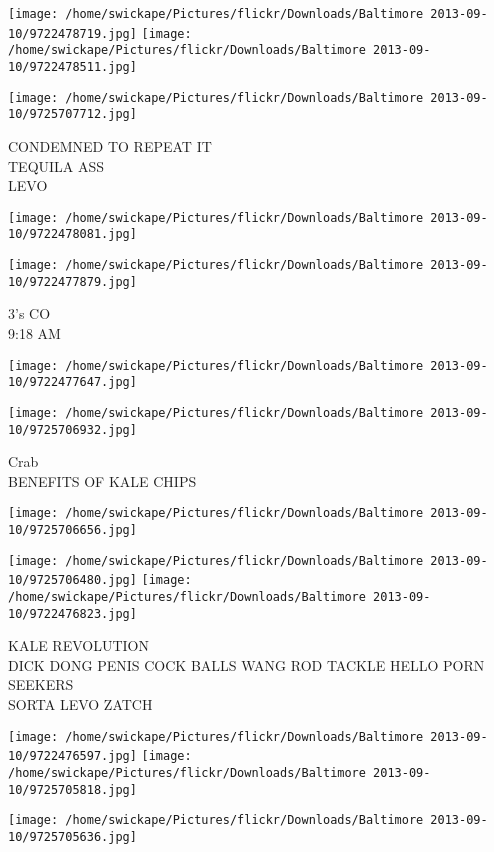 \documentclass[10pt,letterpaper]{article}
\begin{document}
\texttt{[image: /home/swickape/Pictures/flickr/Downloads/Baltimore 2013-09-10/9722478719.jpg]}
\texttt{[image: /home/swickape/Pictures/flickr/Downloads/Baltimore 2013-09-10/9722478511.jpg]}

\texttt{[image: /home/swickape/Pictures/flickr/Downloads/Baltimore 2013-09-10/9725707712.jpg]}

CONDEMNED TO REPEAT IT\\
TEQUILA ASS\\
LEVO
\pagebreak

\texttt{[image: /home/swickape/Pictures/flickr/Downloads/Baltimore 2013-09-10/9722478081.jpg]}

\vspace{0.25in}
\texttt{[image: /home/swickape/Pictures/flickr/Downloads/Baltimore 2013-09-10/9722477879.jpg]}

3's CO\\
9:18 AM
\pagebreak

\texttt{[image: /home/swickape/Pictures/flickr/Downloads/Baltimore 2013-09-10/9722477647.jpg]}

\vspace{0.25in}
\texttt{[image: /home/swickape/Pictures/flickr/Downloads/Baltimore 2013-09-10/9725706932.jpg]}

Crab\\
BENEFITS OF KALE CHIPS
\pagebreak

\texttt{[image: /home/swickape/Pictures/flickr/Downloads/Baltimore 2013-09-10/9725706656.jpg]}

\vspace{0.25in}
\texttt{[image: /home/swickape/Pictures/flickr/Downloads/Baltimore 2013-09-10/9725706480.jpg]}
\texttt{[image: /home/swickape/Pictures/flickr/Downloads/Baltimore 2013-09-10/9722476823.jpg]}

KALE REVOLUTION\\
DICK DONG PENIS COCK BALLS WANG ROD TACKLE HELLO PORN SEEKERS\\
SORTA LEVO ZATCH
\pagebreak

\texttt{[image: /home/swickape/Pictures/flickr/Downloads/Baltimore 2013-09-10/9722476597.jpg]}
\texttt{[image: /home/swickape/Pictures/flickr/Downloads/Baltimore 2013-09-10/9725705818.jpg]}

\texttt{[image: /home/swickape/Pictures/flickr/Downloads/Baltimore 2013-09-10/9725705636.jpg]}
\end{document}
